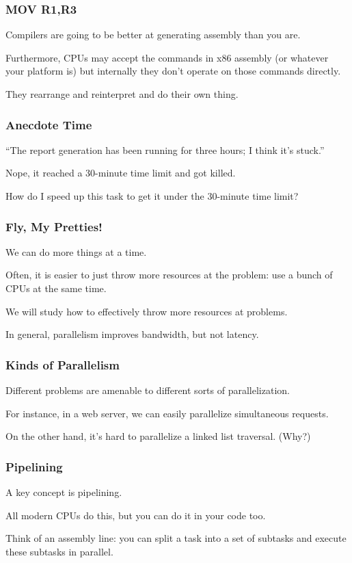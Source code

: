 \begin{frame}
\frametitle{MOV R1,R3}

Compilers are going to be better at generating assembly than you are. 

Furthermore, CPUs may accept the commands in x86 assembly (or whatever your platform is) but internally they don't operate on those commands directly. 

They rearrange and reinterpret and do their own thing. 


\end{frame}



\begin{frame}
\frametitle{Anecdote Time}

``The report generation has been running for three hours; I think it's stuck.''

Nope, it reached a 30-minute time limit and got killed. 

How do I speed up this task to get it under the 30-minute time limit?

\end{frame}



\begin{frame}
\frametitle{Fly, My Pretties!}

We can do more things at a time.

Often, it is easier to just throw more
resources at the problem: use a bunch of CPUs at the same time.

 We
will study how to effectively throw more resources at problems.

In general, parallelism improves bandwidth, but not latency.


\end{frame}



\begin{frame}
\frametitle{Kinds of Parallelism}

Different problems are amenable to different sorts of parallelization. 

For instance, in a web server, we
can easily parallelize simultaneous requests. 

On the other hand, it's hard
to parallelize a linked list traversal. (Why?)



\end{frame}



\begin{frame}
\frametitle{Pipelining}

A key concept is pipelining. 

All modern CPUs do this,
but you can do it in your code too. 

Think of an assembly line: you can split
a task into a set of subtasks and execute these subtasks in parallel.


\end{frame}





